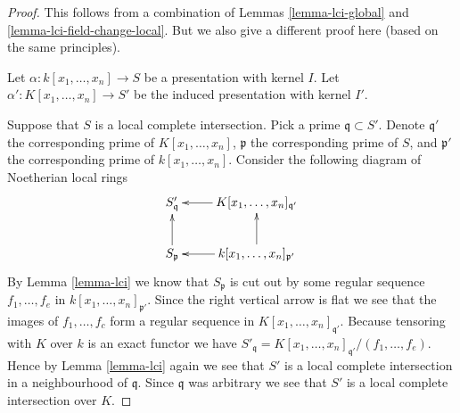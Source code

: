 \begin{proof}
This follows from a combination of Lemmas
\ref{lemma-lci-global} and \ref{lemma-lci-field-change-local}.
But we also give a different
proof here (based on the same principles).

\medskip\noindent
Let $\alpha : k[x_1, \ldots, x_n] \to S$ be a presentation
with kernel $I$. Let $\alpha' : K[x_1, \ldots, x_n] \to S'$
be the induced presentation with kernel $I'$.

\medskip\noindent
Suppose that $S$ is a local complete intersection.
Pick a prime $\mathfrak q \subset S'$. Denote
$\mathfrak q'$ the corresponding prime of $K[x_1, \ldots, x_n]$,
$\mathfrak p$ the corresponding prime of $S$, and
$\mathfrak p'$ the corresponding prime of $k[x_1, \ldots, x_n]$.
Consider the following diagram of Noetherian local rings
$$
\xymatrix{
S'_{\mathfrak q} &  K[x_1, \ldots, x_n]_{\mathfrak q'} \ar[l] \\
S_{\mathfrak p}\ar[u] &  k[x_1, \ldots, x_n]_{\mathfrak p'} \ar[u] \ar[l]
}
$$
By Lemma \ref{lemma-lci} we know that $S_{\mathfrak p}$
is cut out by some regular sequence $f_1, \ldots, f_e$ in
$k[x_1, \ldots, x_n]_{\mathfrak p'}$. Since the right vertical
arrow is flat we see that the images of $f_1, \ldots, f_c$
form a regular sequence in $K[x_1, \ldots, x_n]_{\mathfrak q'}$.
Because tensoring with $K$ over $k$ is an exact functor we have
$S'_{\mathfrak q} = K[x_1, \ldots, x_n]_{\mathfrak q'}/(f_1, \ldots, f_e)$.
Hence by Lemma \ref{lemma-lci} again we see that $S'$ is a local
complete intersection in a neighbourhood of $\mathfrak q$. Since
$\mathfrak q$ was arbitrary we see that $S'$ is a local complete
intersection over $K$.


\end{proof}
